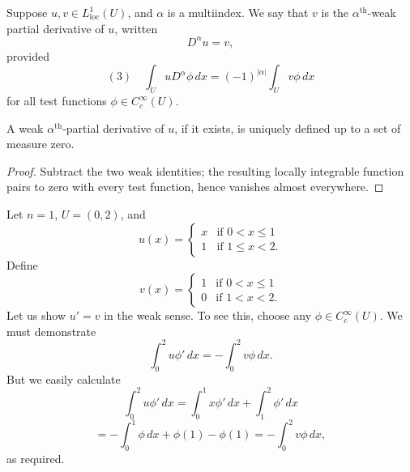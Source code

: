 \begin{definition}
\label{def:weak-partial-derivative}
Suppose $u, v \in L^1_{\text{loc}}(U)$, and $\alpha$ is a multiindex. We say that $v$ is the $\alpha^{\text{th}}$-weak partial derivative of $u$, written
$$D^\alpha u = v,$$
provided
$$(3) \quad \int_U u D^\alpha \phi \, dx = (-1)^{|\alpha|} \int_U v\phi \, dx$$
for all test functions $\phi \in C_c^\infty(U)$.
\end{definition}

\begin{lemma}
\label{lem:weak-derivative-uniqueness}
A weak $\alpha^{\text{th}}$-partial derivative of $u$, if it exists, is uniquely defined up to a set of measure zero.
\end{lemma}

\begin{proof}
\sketch Subtract the two weak identities; the resulting locally integrable function pairs to zero with every test function, hence vanishes almost everywhere.
\end{proof}

\begin{example}
\label{ex:weak-derivative-piecewise-linear-example}
Let $n = 1$, $U = (0,2)$, and
$$u(x) = \begin{cases}
x & \text{if } 0 < x \le 1 \\
1 & \text{if } 1 \le x < 2.
\end{cases}$$
Define
$$v(x) = \begin{cases}
1 & \text{if } 0 < x \le 1 \\
0 & \text{if } 1 < x < 2.
\end{cases}$$
Let us show $u' = v$ in the weak sense. To see this, choose any $\phi \in C_c^\infty(U)$. We must demonstrate
$$\int_0^2 u\phi' \, dx = -\int_0^2 v\phi \, dx.$$
But we easily calculate
$$\int_0^2 u\phi' \, dx = \int_0^1 x\phi' \, dx + \int_1^2 \phi' \, dx$$
$$= -\int_0^1 \phi \, dx + \phi(1) - \phi(1) = -\int_0^2 v\phi \, dx,$$
as required.
\end{example}

